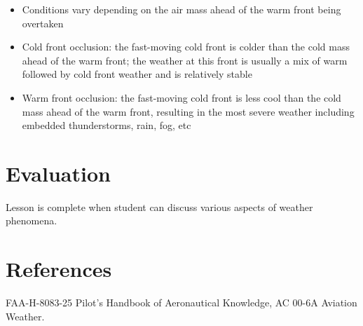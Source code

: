 \begin{itemize}
\begin{itemize}
      \item Conditions vary depending on the air mass ahead of the warm front
        being overtaken

      \item Cold front occlusion: the fast-moving cold front is colder than the
        cold mass ahead of the warm front; the weather at this front is usually
        a mix of warm followed by cold front weather and is relatively stable

      \item Warm front occlusion: the fast-moving cold front is less cool than
        the cold mass ahead of the warm front, resulting in the most severe
        weather including embedded thunderstorms, rain, fog, etc
    \end{itemize}
\end{itemize}

\section{Evaluation}

Lesson is complete when student can discuss various aspects of weather phenomena.

\section{References}

FAA-H-8083-25 Pilot's Handbook of Aeronautical Knowledge, AC 00-6A Aviation
Weather.

